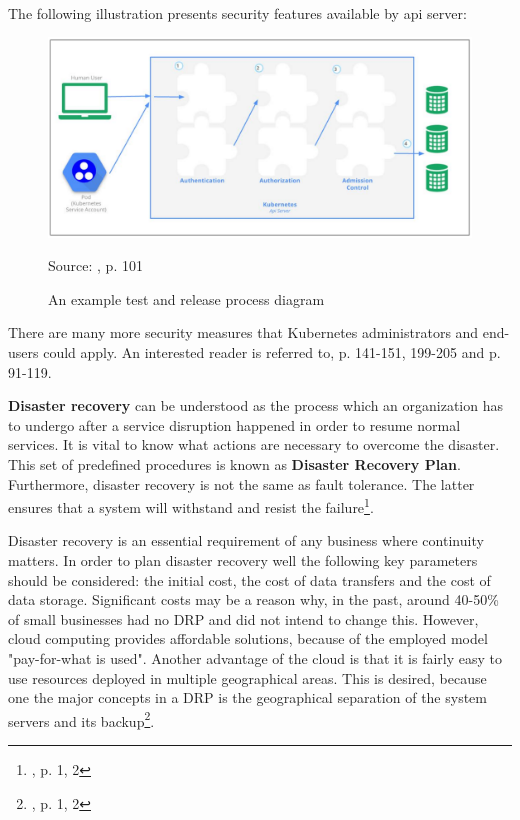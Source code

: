 \paragraph{}
The following illustration presents security features available by api server:
\begin{figure}[H]
    \centering
    \includegraphics[width=13cm]{figures/security-api-server.png}
    \label{fig:security-api-server}
    \caption{An example test and release process diagram}
    \small{Source: \cite{book-mastering-k8s}, p. 101}
\end{figure}

There are many more security measures that Kubernetes administrators and end-users could apply. An interested reader is referred to\cite{book-cndwk}, p. 141-151, 199-205 and \cite{book-mastering-k8s} p. 91-119.

\textbf{Disaster recovery} can be understood as the process which an organization has to undergo after a service  disruption happened in order to resume normal services. It is vital to know what actions are necessary to overcome the disaster. This set of predefined procedures is known as \textbf{Disaster Recovery Plan}. Furthermore, disaster recovery is not the same as fault tolerance. The latter ensures that a system will withstand and resist the failure\footnote{\cite{article-dr}, p. 1, 2}.

Disaster recovery is an essential requirement of any business where continuity matters. In order to plan disaster recovery well the following key parameters should be considered: the initial cost, the cost of data transfers and the cost of data storage. Significant costs may be a reason why, in the past, around 40-50\% of small businesses had no DRP and did not intend to change this. However, cloud computing provides affordable solutions, because of the employed model "pay-for-what is used". Another advantage of the cloud is that it is fairly easy to use resources deployed in multiple geographical areas. This is desired, because one the major concepts in a DRP is the geographical separation of the system servers and its backup\footnote{\cite{article-dr-cloud}, p. 1, 2}.

